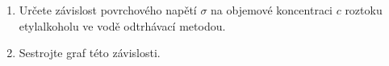 \documentclass[protokol.tex]{subfiles}
\begin{document}
\begin{enumerate}
\item Určete závislost povrchového napětí $\sigma$ na objemové koncentraci $c$ roztoku etylalkoholu ve vodě odtrhávací metodou. 
\item Sestrojte graf této závislosti.
\end{enumerate}
\end{document}
